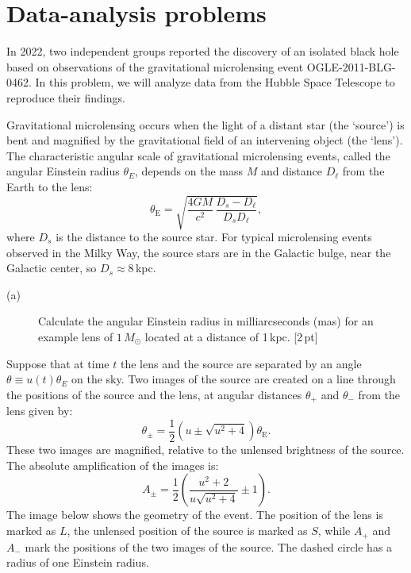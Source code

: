 \section*{Data-analysis problems}

In 2022, two independent groups reported the discovery of an isolated black
hole based on observations of the gravitational microlensing event
OGLE-2011-BLG-0462. In this problem, we will analyze data from the Hubble
Space Telescope to reproduce their findings.

Gravitational microlensing occurs when the light of a distant star (the
`source') is bent and magnified by the gravitational field of an intervening
object (the `lens'). The characteristic angular scale of gravitational
microlensing events, called the angular Einstein radius $\theta_E$, depends on
the mass $M$ and distance $D_\ell$ from the Earth to the lens:
\[ \theta_{\mathrm{E}} = \sqrt{\frac{4GM}{c^2}\,
   \frac{D_s - D_\ell}{D_s D_\ell}}, \]
where $D_s$ is the distance to the source star. For typical microlensing
events observed in the Milky Way, the source stars are in the Galactic bulge,
near the Galactic center, so $D_s \approx 8$\,kpc.

\begin{description}
\item[(a)] Calculate the angular Einstein radius in milliarcseconds (mas) for
  an example lens of $1\,M_\odot$ located at a distance of 1\,kpc.
  \hfill[2\,pt]
\end{description}

Suppose that at time $t$ the lens and the source are separated by an angle
$\theta \equiv u(t)\theta_E$ on the sky. Two images of the source are created
on a line through the positions of the source and the lens, at angular
distances $\theta_+$ and $\theta_-$ from the lens given by:
\[ \theta_\pm = \frac{1}{2}\left(u \pm \sqrt{u^2 + 4}\right)
   \theta_{\mathrm{E}}. \]
These two images are magnified, relative to the unlensed brightness of the
source. The absolute amplification of the images is:
\[ A_\pm = \frac{1}{2}\left(\frac{u^2 + 2}{u\sqrt{u^2 + 4}} \pm 1\right). \]
The image below shows the geometry of the event. The position of the lens is
marked as $L$, the unlensed position of the source is marked as $S$, while
$A_+$ and $A_-$ mark the positions of the two images of the source. The
dashed circle has a radius of one Einstein radius.

